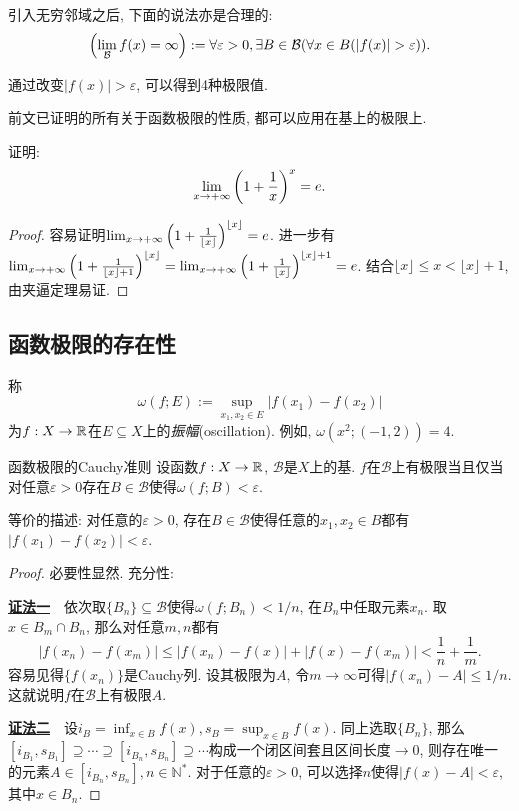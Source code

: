 引入无穷邻域之后, 下面的说法亦是合理的: $$\ssb{\lim_{\mathcal{B}} f(x) = \infty }:=\forall \varepsilon > 0, \exists B \in \mathcal{B} (\forall x \in B (|f(x)|>\varepsilon)).$$

通过改变$|f(x)|>\varepsilon$, 可以得到4种极限值. 

前文已证明的所有关于函数极限的性质, 都可以应用在基上的极限上. 

\begin{example}
	证明: $$\lim_{x\to +\infty} \left( 1+\frac{1}{x} \right)^x = e.$$
\end{example}
\begin{proof}
	容易证明$\lim_{x\to +\infty} \left( 1+\frac{1}{\lfloor x \rfloor} \right)^{\lfloor x \rfloor} = e$. 进一步有$\lim_{x\to +\infty} \left( 1+\frac{1}{\lfloor x \rfloor + 1} \right)^{\lfloor x \rfloor} = \lim_{x\to +\infty} \left( 1+\frac{1}{\lfloor x \rfloor} \right)^{\lfloor x \rfloor + 1} = e$. 结合$\lfloor x \rfloor \leq x < \lfloor x \rfloor +1$, 由夹逼定理易证. 
\end{proof}

\subsection{函数极限的存在性}

称$$\omega (f;E):=\sup_{x_1,x_2 \in E} |f(x_1)-f(x_2)|$$为$f:X \to \mathbb{R}$在$E \subseteq X$上的\textit{振幅}(oscillation). 例如, $\omega (x^2;(-1,2))=4$. 

\begin{theorem}{函数极限的Cauchy准则} \label{pro:hjuucauchy}
	设函数$f:X \to \mathbb{R}$, $\mathcal{B}$是$X$上的基. $f$在$\mathcal{B}$上有极限当且仅当对任意$\varepsilon >0$存在$B \in \mathcal{B}$使得$\omega (f;B) < \varepsilon$. 
\end{theorem}
\begin{remark}
	等价的描述: 对任意的$\varepsilon > 0$, 存在$B \in \mathcal{B}$使得任意的$x_1,x_2 \in B$都有$|f(x_1)-f(x_2)|<\varepsilon$. 
\end{remark}
\begin{proof}
	必要性显然. 充分性: 
	
	\underline{\textbf{证法一}}~~依次取$\{ B_n \} \subseteq \mathcal{B}$使得$\omega (f;B_n)<1/n$, 在$B_n$中任取元素$x_n$. 取$x \in B_m \cap B_n$, 那么对任意$m,n$都有$$|f(x_n)-f(x_m)| \leq |f(x_n)-f(x)| + |f(x)-f(x_m)| < \frac{1}{n} + \frac{1}{m}. $$
	容易见得$\{ f(x_n) \}$是Cauchy列. 设其极限为$A$, 令$m\to \infty$可得$|f(x_n)-A| \leq 1/n$. 这就说明$f$在$\mathcal{B}$上有极限$A$. 
	
	\underline{\textbf{证法二}}~~设$i_B = \inf_{x \in B}f(x), s_B = \sup_{x \in B}f(x)$. 同上选取$\{ B_n \}$, 那么$[i_{B_1},s_{B_1}] \supseteq \cdots \supseteq [i_{B_n},s_{B_n}] \supseteq \cdots$构成一个闭区间套且区间长度$\to 0$, 则存在唯一的元素$A \in [i_{B_n},s_{B_n}], n\in \mathbb{N}^*$. 对于任意的$\varepsilon >0$, 可以选择$n$使得$|f(x)-A|<\varepsilon$, 其中$x \in B_n$. 
\end{proof}

